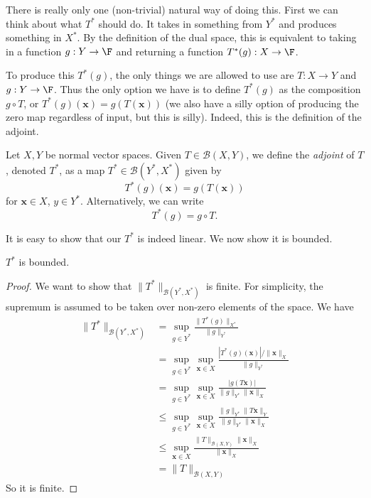 \documentclass[a4paper]{article}
\begin{document}
There is really only one (non-trivial) natural way of doing this. First we can think about what $T^*$ should do. It takes in something from $Y^*$ and produces something in $X^*$. By the definition of the dual space, this is equivalent to taking in a function $g: Y \to \F$ and returning a function $T^*(g): X\to \F$.

To produce this $T^*(g)$, the only things we are allowed to use are $T: X\to Y$ and $g: Y\to \F$. Thus the only option we have is to define $T^*(g)$ as the composition $g\circ T$, or $T^*(g)(\mathbf{x}) = g(T(\mathbf{x}))$ (we also have a silly option of producing the zero map regardless of input, but this is silly). Indeed, this is the definition of the adjoint.

\begin{defi}[Adjoint]
  Let $X, Y$ be normal vector spaces. Given $T\in \mathcal{B}(X, Y)$, we define the \emph{adjoint} of $T$, denoted $T^*$, as a map $T^*\in \mathcal{B}(Y^*, X^*)$ given by
  \[
    T^*(g)(\mathbf{x}) = g(T(\mathbf{x}))
  \]
  for $\mathbf{x} \in X$, $y\in Y^*$. Alternatively, we can write
  \[
    T^*(g) = g\circ T.
  \]
\end{defi}
It is easy to show that our $T^*$ is indeed linear. We now show it is bounded.

\begin{prop}
  $T^*$ is bounded.
\end{prop}

\begin{proof}
  We want to show that $\|T^*\|_{\mathcal{B}(Y^*, X^*)}$ is finite. For simplicity, the supremum is assumed to be taken over non-zero elements of the space. We have
  \begin{align*}
    \|T^*\|_{\mathcal{B}(Y^*, X^*)} &= \sup_{g\in Y^*}\frac{\|T^*(g)\|_{X^*}}{\|g\|_{Y^*}}\\
    &= \sup_{g\in Y^*}\sup_{\mathbf{x}\in X}\frac{|T^*(g)(\mathbf{x})|/\|\mathbf{x}\|_X}{\|g\|_{Y^*}}\\
    &= \sup_{g\in Y^*}\sup_{\mathbf{x}\in X} \frac{|g(T\mathbf{x})|}{\|g\|_{Y^*}\|\mathbf{x}\|_X}\\
    &\leq \sup_{g\in Y^*}\sup_{\mathbf{x}\in X} \frac{\|g\|_{Y^*}\|T\mathbf{x}\|_Y}{\|g\|_{Y^*}\|\mathbf{x}\|_X}\\
    &\leq \sup_{\mathbf{x}\in X} \frac{\|T\|_{\mathcal{B}(X, Y)}\|\mathbf{x}\|_X}{\|\mathbf{x}\|_X}\\
    &= \|T\|_{\mathcal{B}(X, Y)}
  \end{align*}
  So it is finite.
\end{proof}
\end{document}
